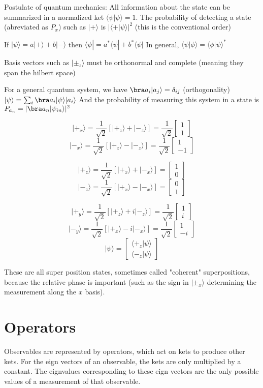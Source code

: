 \documentclass{homework}
\newcommand{\m}[1]{\begin{bmatrix} #1 \end{bmatrix}}
\newcommand{\kt}{\rangle}
\newcommand{\br}{\langle}
\begin{document}
Postulate of quantum mechanics: 
All information about the state can be summarized in a normalized ket $\br \psi | \psi \kt = 1$. 
The probability of detecting a state (abreviated as $P_x$) such as $| + \kt$ is $| \br + | \psi \kt |^2$ (this is the conventional order)

If $|\psi \kt = a | + \kt + b | - \kt$ then $\br \psi | = a^* \br \psi | + b^* \br \psi |$
In general, $\br \psi | \phi \kt = \br  \phi | \psi \kt^*$

Basis vectors such as $| \pm_z \kt$ must be orthonormal and complete (meaning they span the hilbert space)

For a general quantum system, we have 
$\bra a_i | a_j \kt = \delta_{ij}$ (orthogonality)
$| \psi \kt = \sum_i \bra a_i | \psi \kt |a_i \kt$
And the probability of measuring this system in a state is 
$P_{a_n} = |\bra a_n | \psi_{in} \kt|^2$


\[| +_x \kt = \frac{1}{\sqrt{2}}[|+_z \kt + |-_z \kt] = \frac{1}{\sqrt{2}} \m{ 1\\ 1}\]
\[| -_x \kt = \frac{1}{\sqrt{2}}[|+_z \kt - |-_z \kt]= \frac{1}{\sqrt{2}} \m{ 1\\ -1}\]

\[| +_z \kt = \frac{1}{\sqrt{2}}[|+_x \kt + |-_x \kt] =  \m{ 1\\ 0}\]
\[| -_z \kt = \frac{1}{\sqrt{2}}[|+_x \kt - |-_x \kt] = \m{ 0\\ 1}\]

\[| +_y \kt = \frac{1}{\sqrt{2}}[|+_z \kt + i|-_z \kt] = \frac{1}{\sqrt{2}} \m{ 1\\ i}\]
\[| -_y \kt = \frac{1}{\sqrt{2}}[|+_x \kt - i|-_x \kt] = \frac{1}{\sqrt{2}} \m{ 1\\ -i}\]
\[| \psi  \kt = \m{\br +_z|\psi \kt \\ \br -_z|\psi \kt}\]

These are all super position states, sometimes called "coherent" superpositions, because the relative phase is important (such as the sign in $| \pm_x \kt$ determining the measurement along the $x$ basis).

\section{Operators}

Observables are represented by operators, which act on kets to produce other kets. For the eign vectors of an observable, the kets are only multiplied by a constant. The eignvalues corresponding to these eign vectors are the only possible values of a measurement of that observable.
\end{document}
